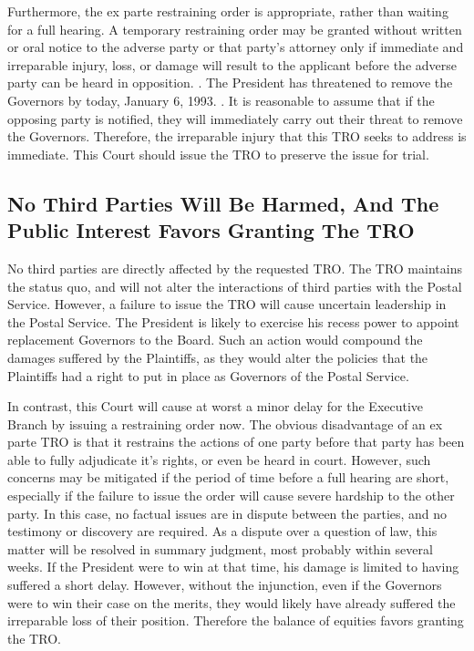 \documentclass[12pt,\documentclassflag]{complaint}
\begin{document}
Furthermore, the ex parte restraining order is appropriate, rather than waiting for a full hearing. A temporary restraining order may be granted without written or oral notice to the adverse party or that party's attorney only if immediate and irreparable injury, loss, or damage will result to the applicant before the adverse party can be heard in opposition. \See {}.  The President has threatened to remove the Governors by today, January 6, 1993.  \See {}. It is reasonable to assume that if the opposing party is notified, they will immediately carry out their threat to remove the Governors.  Therefore, the irreparable injury that this TRO seeks to address is immediate.  This Court should issue the TRO to preserve the issue for trial. 
 
\subsection{No Third Parties Will Be Harmed, And The Public Interest Favors Granting The TRO}

No third parties are directly affected by the requested TRO.  The TRO maintains the status quo, and will not alter the interactions of third parties with the Postal Service.  However, a failure to issue the TRO will cause uncertain leadership in the Postal Service.  The President is likely to exercise his recess power to appoint replacement Governors to the Board.  Such an action would compound the damages suffered by the Plaintiffs, as they would alter the policies that the Plaintiffs had a right to put in place as Governors of the Postal Service.   

In contrast, this Court will cause at worst a minor delay for the Executive Branch by issuing a restraining order now.  The obvious disadvantage of an ex parte TRO is that it restrains the actions of one party before that party has been able to fully adjudicate it's rights, or even be heard in court.  However, such concerns may be mitigated if the period of time before a full hearing are short, especially if the failure to issue the order will cause severe hardship to the other party.  In this case, no factual issues are in dispute between the parties, and no testimony or discovery are required.  As a dispute over a question of law, this matter will be resolved in summary judgment, most probably within several weeks.  If the President were to win at that time, his damage is limited to having suffered a short delay.  However, without the injunction, even if the Governors were to win their case on the merits, they would likely have already suffered the irreparable loss of their position.  Therefore the balance of equities favors granting the TRO.
\end{document}
